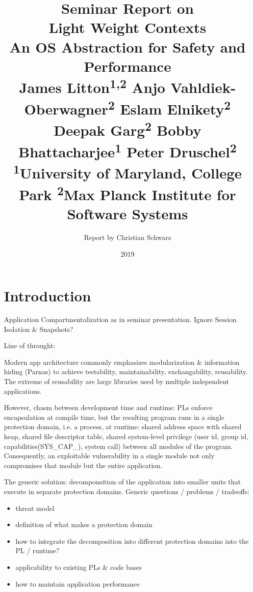 \documentclass[10pt,twocolumn,letter]{article}
\begin{document}
\title{%
  {\normalfont \normalsize Seminar Report on}\\%
  Light Weight Contexts\\%
  {\normalfont \normalsize An OS Abstraction for Safety and Performance}\\%
  {\normalfont \small %
    James Litton\textsuperscript{1,2}
    Anjo Vahldiek-Oberwagner\textsuperscript{2}
    Eslam Elnikety\textsuperscript{2}
    Deepak Garg\textsuperscript{2}
    Bobby Bhattacharjee\textsuperscript{1}
    Peter Druschel\textsuperscript{2}
  }\\
  {\normalfont \small
    \textsuperscript{1}University of Maryland, College Park 
    \textsuperscript{2}Max Planck Institute for Software Systems
  }%
}
\author{Report by Christian Schwarz}
\date{2019}

\maketitle

\begin{abstract}
  \blindtext
\end{abstract}

\section{Introduction}\label{intro}

Application Compartmentalization as in seminar presentation. Ignore Session Isolation \& Snapshots?

Line of throught:

Modern app architecture commonly emphasizes modularization \& information hiding (Parnas) to achieve testability, maintainability, exchangability, reusability.
The extreme of reusability are large libraries used by multiple independent applications.

However, chasm between development time and runtime:
PLs enforce encapsulation at compile time, but the resulting program runs in a single protection domain, i.e. a process, at runtime:
shared address space with shared heap, shared file descriptor table, shared system-level privilege (user id, group id, capabilities(SYS\_CAP\_), system call) between all modules of the program.
Consequently, an exploitable vulnerability in a single module not only compromises that module but the entire application.

The generic solution: decomponsition of the application into smaller units that execute in separate protection domains.
Generic questions / problems / tradeoffs:
\begin{itemize}
  \item threat model
  \item definition of what makes a protection domain
  \item how to integrate the decomposition into different protection domains into the PL / runtime?
  \item applicability to existing PLs \& code bases
  \item how to maintain application performance
\end{itemize}
\end{document}
